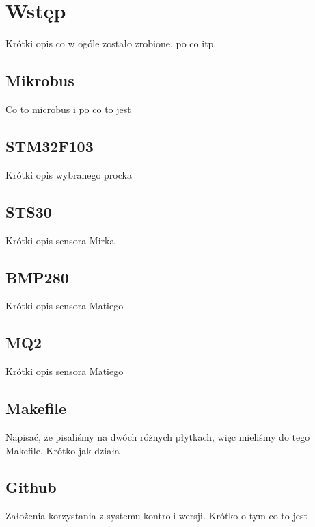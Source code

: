 \chapter{Wstęp}
\label{cha:introduction}
Krótki opis co w ogóle zostało zrobione, po co itp.

\section{Mikrobus\texttrademark}
Co to microbus i po co to jest

\section{STM32F103}
Krótki opis wybranego procka


\section{STS30}

Krótki opis sensora Mirka

\section{BMP280}

Krótki opis sensora Matiego

\section{MQ2}

Krótki opis sensora Matiego

\section{Makefile}
Napisać, że pisaliśmy na dwóch różnych płytkach, więc mieliśmy do tego Makefile. Krótko jak działa

\section{Github}
Założenia korzystania z systemu kontroli wersji. Krótko o tym co to jest